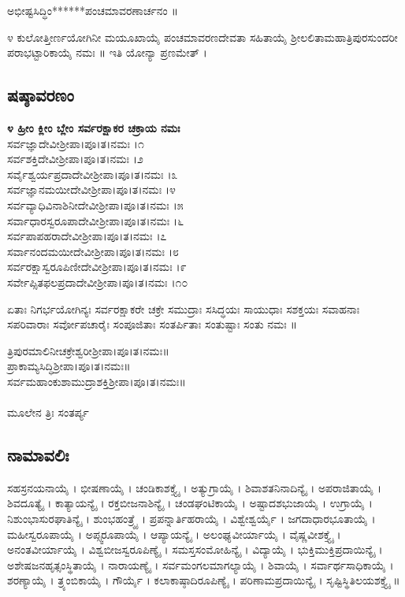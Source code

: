  ಅಭೀಷ್ಟಸಿದ್ಧಿಂ******ಪಂಚಮಾವರಣಾರ್ಚನಂ ॥

೪ ಕುಲೋತ್ತೀರ್ಣಯೋಗಿನೀ ಮಯೂಖಾಯೈ ಪಂಚಮಾವರಣದೇವತಾ ಸಹಿತಾಯೈ ಶ್ರೀಲಲಿತಾಮಹಾತ್ರಿಪುರಸುಂದರೀ ಪರಾಭಟ್ಟಾರಿಕಾಯೈ ನಮಃ ॥ ಇತಿ ಯೋನ್ಯಾ ಪ್ರಣಮೇತ್ ।
\subsection{ಷಷ್ಠಾವರಣಂ}
{\bfseries ೪ ಹ್ರೀಂ ಕ್ಲೀಂ ಬ್ಲೇಂ ಸರ್ವರಕ್ಷಾಕರ ಚಕ್ರಾಯ ನಮಃ}\\
 ಸರ್ವಜ್ಞಾದೇವೀಶ್ರೀಪಾ।ಪೂ।ತ।ನಮಃ ।೧\\
 ಸರ್ವಶಕ್ತಿದೇವೀಶ್ರೀಪಾ।ಪೂ।ತ।ನಮಃ ।೨\\
 ಸರ್ವೈಶ್ವರ್ಯಪ್ರದಾದೇವೀಶ್ರೀಪಾ।ಪೂ।ತ।ನಮಃ ।೩\\
 ಸರ್ವಜ್ಞಾನಮಯೀದೇವೀಶ್ರೀಪಾ।ಪೂ।ತ।ನಮಃ ।೪\\
 ಸರ್ವವ್ಯಾಧಿವಿನಾಶಿನೀದೇವೀಶ್ರೀಪಾ।ಪೂ।ತ।ನಮಃ ।೫\\
 ಸರ್ವಾಧಾರಸ್ವರೂಪಾದೇವೀಶ್ರೀಪಾ।ಪೂ।ತ।ನಮಃ ।೬\\
 ಸರ್ವಪಾಪಹರಾದೇವೀಶ್ರೀಪಾ।ಪೂ।ತ।ನಮಃ ।೭\\
 ಸರ್ವಾನಂದಮಯೀದೇವೀಶ್ರೀಪಾ।ಪೂ।ತ।ನಮಃ ।೮\\
 ಸರ್ವರಕ್ಷಾಸ್ವರೂಪಿಣೀದೇವೀಶ್ರೀಪಾ।ಪೂ।ತ।ನಮಃ ।೯\\
 ಸರ್ವೇಪ್ಸಿತಫಲಪ್ರದಾದೇವೀಶ್ರೀಪಾ।ಪೂ।ತ।ನಮಃ ।೧೦

 ಏತಾಃ ನಿಗರ್ಭಯೋಗಿನ್ಯಃ ಸರ್ವರಕ್ಷಾಕರೇ ಚಕ್ರೇ ಸಮುದ್ರಾಃ ಸಸಿದ್ಧಯಃ ಸಾಯುಧಾಃ ಸಶಕ್ತಯಃ ಸವಾಹನಾಃ ಸಪರಿವಾರಾಃ ಸರ್ವೋಪಚಾರೈಃ ಸಂಪೂಜಿತಾಃ ಸಂತರ್ಪಿತಾಃ ಸಂತುಷ್ಟಾಃ ಸಂತು ನಮಃ ॥

 ತ್ರಿಪುರಮಾಲಿನೀಚಕ್ರೇಶ್ವರೀಶ್ರೀಪಾ।ಪೂ।ತ।ನಮಃ॥\\
 ಪ್ರಾಕಾಮ್ಯಸಿದ್ಧಿಶ್ರೀಪಾ।ಪೂ।ತ।ನಮಃ॥\\
 ಸರ್ವಮಹಾಂಕುಶಾಮುದ್ರಾಶಕ್ತಿಶ್ರೀಪಾ।ಪೂ।ತ।ನಮಃ॥\\
\\
ಮೂಲೇನ ತ್ರಿಃ ಸಂತರ್ಪ್ಯ
\subsection{ನಾಮಾವಲಿಃ}
ಸಹಸ್ರನಯನಾಯೈ । ಭೀಷಣಾಯೈ । ಚಂಡಿಕಾಶಕ್ತ್ಯೈ । ಅತ್ಯುಗ್ರಾಯೈ । ಶಿವಾಶತನಿನಾದಿನ್ಯೈ । ಅಪರಾಜಿತಾಯೈ । ಶಿವದೂತ್ಯೈ । ಕಾತ್ಯಾಯನ್ಯೈ । ರಕ್ತಬೀಜನಾಶಿನ್ಯೈ । ಚಂಡಘಂಟಿಕಾಯೈ । ಅಷ್ಟಾದಶಭುಜಾಯೈ । ಉಗ್ರಾಯೈ । ನಿಶುಂಭಾಸುರಘಾತಿನ್ಯೈ । ಶುಂಭಹಂತ್ರ್ಯೈ । ಪ್ರಪನ್ನಾರ್ತಿಹರಾಯೈ । ವಿಶ್ವೇಶ್ವರ್ಯೈ । ಜಗದಾಧಾರಭೂತಾಯೈ । ಮಹೀಸ್ವರೂಪಾಯೈ । ಅಪ್ಸ್ವರೂಪಾಯೈ । ಆಪ್ಯಾಯನ್ಯೈ । ಅಲಂಘ್ಯವೀರ್ಯಾಯೈ । ವೈಷ್ಣವೀಶಕ್ತ್ಯೈ । ಅನಂತವೀರ್ಯಾಯೈ । ವಿಶ್ವಬೀಜಸ್ವರೂಪಿಣ್ಯೈ । ಸಮಸ್ತಸಂಮೋಹಿನ್ಯೈ । ವಿದ್ಯಾಯೈ । ಭುಕ್ತಿಮುಕ್ತಿಪ್ರದಾಯಿನ್ಯೈ । ಅಶೇಷಜನಹೃತ್ಸಂಸ್ಥಿತಾಯೈ । ನಾರಾಯಣ್ಯೈ । ಸರ್ವಮಂಗಲಮಾಗಲ್ಯಾಯೈ । ಶಿವಾಯೈ । ಸರ್ವಾರ್ಥಸಾಧಿಕಾಯೈ । ಶರಣ್ಯಾಯೈ । ತ್ರ್ಯಂಬಿಕಾಯೈ । ಗೌರ್ಯೈ । ಕಲಾಕಾಷ್ಠಾದಿರೂಪಿಣ್ಯೈ । ಪರಿಣಾಮಪ್ರದಾಯಿನ್ಯೈ । ಸೃಷ್ಟಿಸ್ಥಿತಿಲಯಶಕ್ತ್ಯೈ ॥\\

